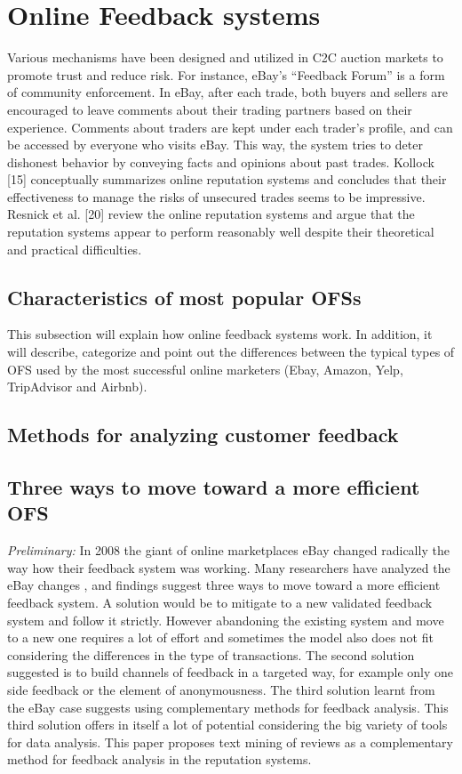 \section{Online Feedback systems}

Various mechanisms have been designed and utilized
in C2C auction markets to promote trust and reduce risk.
For instance,
eBay's “Feedback Forum” is a form of community enforcement.
In eBay, after each trade, both buyers and
sellers are encouraged to leave comments about their
trading partners based on their experience. Comments
about traders are kept under each trader's profile, and can be accessed by everyone who visits eBay. This way, the
system tries to deter dishonest behavior by conveying
facts and opinions about past trades. Kollock [15]
conceptually summarizes online reputation systems and
concludes that their effectiveness to manage the risks of
unsecured trades seems to be impressive. Resnick et al.
[20] review the online reputation systems and argue that
the reputation systems appear to perform reasonably well
despite their theoretical and practical difficulties. \cite{yang2007effects}


\subsection{Characteristics of most popular OFSs}
\label{subsec:popularOFS}

This subsection will explain how online feedback systems work. In addition, it will describe, categorize and point out the differences between the typical types of OFS used by the most successful online marketers (Ebay, Amazon, Yelp, TripAdvisor and Airbnb). 

\subsection{Methods for analyzing customer feedback}
\label{subsec:feedbackmethods}
\subsection{Three ways to move toward a more efficient OFS}
\textit{Preliminary:} In 2008 the giant of online marketplaces eBay changed radically the way how their feedback system was working. Many researchers have analyzed the eBay changes \cite{fradkin2016bias,resnick2006value,bolton2013engineering,dini2009buying,dellarocas2008sound}, and findings suggest three ways to move toward a more efficient feedback system. A solution would be to mitigate to a new validated feedback system and follow it strictly. However abandoning the existing system and move to a new one requires a lot of effort and sometimes the model also does not fit considering the differences in the type of transactions. The second solution suggested is to build channels of feedback in a targeted way, for example only one side feedback or the element of anonymousness. The third solution learnt from the eBay case suggests using complementary methods for feedback analysis. This third solution offers in itself a lot of potential considering the big variety of tools for data analysis. This paper proposes text mining of reviews as a complementary method for feedback analysis in the reputation systems. 